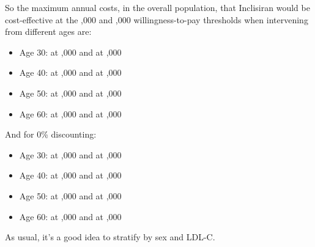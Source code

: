 \documentclass[11pt]{article}
\begin{document}
\color{Blue4}
\begin{stlog}\end{stlog}
\begin{stlog}\end{stlog}
\color{black}

So the maximum annual costs, in the overall population, that Inclisiran
would be cost-effective at the ,000 and ,000
willingness-to-pay thresholds when intervening from different ages are: 
\begin{itemize}
\item Age 30:  at ,000 and  at ,000
\item Age 40:  at ,000 and  at ,000
\item Age 50:  at ,000 and  at ,000
\item Age 60:  at ,000 and  at ,000
\end{itemize}

And for 0\% discounting:
\begin{itemize}
\item Age 30:  at ,000 and  at ,000
\item Age 40:  at ,000 and  at ,000
\item Age 50:  at ,000 and  at ,000
\item Age 60:  at ,000 and  at ,000
\end{itemize}

As usual, it's a good idea to stratify by sex and LDL-C.

\color{Blue4}
\begin{stlog}\end{stlog}
\color{black}
\end{document}
